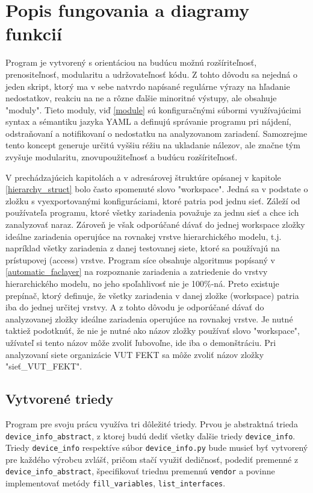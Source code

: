\section{Popis fungovania a diagramy funkcií}
\label{popis_fungovania}
Program je vytvorený s orientáciou na budúcu možnú rozšíriteľnosť, prenositeľnosť, modularitu a udržovateľnosť kódu. Z tohto dôvodu sa nejedná o jeden skript, ktorý ma v sebe natvrdo napísané regulárne výrazy na hľadanie nedostatkov, reakciu na ne a rôzne ďalšie minoritné výstupy, ale obsahuje "moduly". Tieto moduly, viď \ref{module} sú konfiguračnými súbormi využívajúcimi syntax a sémantiku jazyka YAML a definujú správanie programu pri nájdení, odstraňovaní a notifikovaní o nedostatku na analyzovanom zariadení. Samozrejme tento koncept generuje určitú vyššiu réžiu na ukladanie nálezov, ale značne tým zvyšuje modularitu, znovupoužiteľnosť a budúcu rozšíriteľnosť.

V prechádzajúcich kapitolách a v adresárovej štruktúre opísanej v kapitole \ref{hierarchy_struct} bolo často spomenuté slovo "workspace". Jedná sa v podstate o zložku s vyexportovanými konfiguráciami, ktoré patria pod jednu sieť. Záleží od používateľa programu, ktoré všetky zariadenia považuje za jednu sieť a chce ich zanalyzovať naraz. Zároveň je však odporúčané dávať do jednej workspace zložky ideálne zariadenia operujúce na rovnakej vrstve hierarchického modelu, t.j. napríklad všetky zariadenia z danej testovanej siete, ktoré sa používajú na prístupovej (access) vrstve. Program síce obsahuje algoritmus popísaný v \ref{automatic_faclayer} na rozpoznanie zariadenia a zatriedenie do vrstvy hierarchického modelu, no jeho spoľahlivosť nie je 100\%-ná. Preto existuje prepínač, ktorý definuje, že všetky zariadenia v danej zložke (workspace) patria iba do jednej určitej vrstvy. A z tohto dôvodu je odporúčané dávať do analyzovanej zložky ideálne zariadenia operujúce na rovnakej vrstve. Je nutné taktiež podotknúť, že nie je nutné ako názov zložky používať slovo "workspace", užívateľ si tento názov môže zvoliť ľubovoľne, ide iba o demonštráciu. Pri analyzovaní siete organizácie VUT FEKT sa môže zvoliť názov zložky "sieť\_VUT\_FEKT".

\subsection{Vytvorené triedy}
Program pre svoju prácu využíva tri dôležité triedy. Prvou je abstraktná trieda \texttt{device\_info\_abstract}, z ktorej budú dediť všetky ďalšie triedy \texttt{device\_info}. Triedy \texttt{device\_info} respektíve súbor \texttt{device\_info.py} bude musieť byť vytvorený pre každého výrobcu zvlášť, pričom stačí využiť dedičnosť, podediť premenné z \texttt{device\_info\_abstract}, špecifikovať triednu premennú \texttt{vendor} a povinne implementovať metódy \texttt{fill\_variables}, \texttt{list\_interfaces}.


